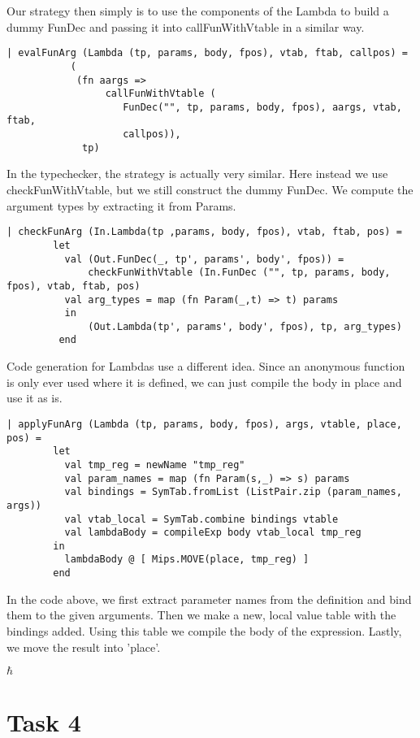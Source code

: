\documentclass[10pt]{article}
\begin{document}
Our strategy then simply is to use the components of the Lambda to build a dummy FunDec and passing it into callFunWithVtable in a similar way.

\begin{Verbatim}[frame=single]
    | evalFunArg (Lambda (tp, params, body, fpos), vtab, ftab, callpos) =
           (
            (fn aargs =>
                 callFunWithVtable (
                    FunDec("", tp, params, body, fpos), aargs, vtab, ftab,
                    callpos)),
             tp)
\end{Verbatim}

In the typechecker, the strategy is actually very similar. Here instead we use checkFunWithVtable, but we still construct the dummy FunDec. We compute the argument types by extracting it from Params.

\begin{Verbatim}[frame=single]
    | checkFunArg (In.Lambda(tp ,params, body, fpos), vtab, ftab, pos) =
        let 
          val (Out.FunDec(_, tp', params', body', fpos)) = 
              checkFunWithVtable (In.FunDec ("", tp, params, body, fpos), vtab, ftab, pos)
          val arg_types = map (fn Param(_,t) => t) params
          in
              (Out.Lambda(tp', params', body', fpos), tp, arg_types)
         end
\end{Verbatim}

Code generation for Lambdas use a different idea. Since an anonymous function is only ever used where it is defined, we can just compile the body in place and use it as is.

\begin{Verbatim}[frame=single]
      | applyFunArg (Lambda (tp, params, body, fpos), args, vtable, place, pos) =
        let  
          val tmp_reg = newName "tmp_reg"
          val param_names = map (fn Param(s,_) => s) params
          val bindings = SymTab.fromList (ListPair.zip (param_names, args))
          val vtab_local = SymTab.combine bindings vtable
          val lambdaBody = compileExp body vtab_local tmp_reg
        in   
          lambdaBody @ [ Mips.MOVE(place, tmp_reg) ]
        end
\end{Verbatim}

In the code above, we first extract parameter names from the definition and bind them to the given arguments. Then we make a new, local value table with the bindings added. Using this table we compile the body of the expression. Lastly, we move the result into 'place'.

$\hbar$

\section{Task 4}

\begin{Verbatim}[frame=single]

\end{Verbatim}
\end{document}

